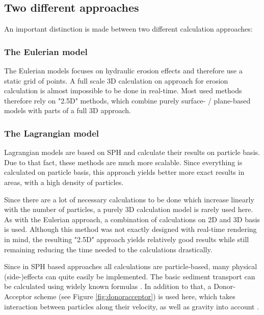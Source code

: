 \subsection{Two different approaches}
An important distinction is made between two different calculation approaches:

\subsubsection{The Eulerian model}
The Eulerian models focuses on hydraulic erosion effects and therefore use a static grid of points. A full scale 3D calculation on approach for erosion calculation is almost impossible to be done in real-time. Most used methods therefore rely on "2.5D" methods, which combine purely surface- / plane-based models with parts of a full 3D approach.

\subsubsection{The Lagrangian model}
Lagrangian models are based on SPH and calculate their results on particle basis. Due to that fact, these methods are much more scalable. Since everything is calculated on particle basis, this approach yields better more exact results in areas, with a high density of particles.

Since there are a lot of necessary calculations to be done which increase linearly with the number of particles, a purely 3D calculation model is rarely used here. As with the Eulerian approach, a combination of calculations on 2D and 3D basis is used. Although this method was not exactly designed with real-time rendering in mind, the resulting "2.5D" approach yields relatively good results while still remaining reducing the time needed to the calculations drastically.

Since in SPH based approaches all calculations are particle-based, many physical (side-)effects can quite easily be implemented. The basic sediment transport can be calculated using widely known formulas \cite{krivstof2009hydraulic}. In addition to that, a Donor-Acceptor scheme (see Figure \ref{fig:donoracceptor}) is used here, which takes interaction between particles along their velocity, as well as gravity into account \cite{krivstof2009hydraulic}.

